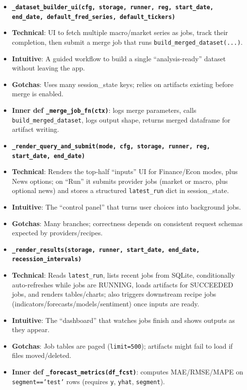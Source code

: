 \documentclass[11pt]{article}
\begin{document}
\begin{itemize}[leftmargin=*,nosep]
\item \textbf{\texttt{\_dataset\_builder\_ui(cfg, storage, runner, reg, start\_date, end\_date, default\_fred\_series, default\_tickers)}}
\item \textbf{Technical}: UI to fetch multiple macro/market series as jobs, track their completion, then submit a merge job that runs \texttt{build\_merged\_dataset(...)}.
\item \textbf{Intuitive}: A guided workflow to build a single “analysis-ready” dataset without leaving the app.
\item \textbf{Gotchas}: Uses many session\_state keys; relies on artifacts existing before merge is enabled.
\item \textbf{Inner def \texttt{\_merge\_job\_fn(ctx)}}: logs merge parameters, calls \texttt{build\_merged\_dataset}, logs output shape, returns merged dataframe for artifact writing.
\end{itemize}



\begin{itemize}[leftmargin=*,nosep]
\item \textbf{\texttt{\_render\_query\_and\_submit(mode, cfg, storage, runner, reg, start\_date, end\_date)}}
\item \textbf{Technical}: Renders the top-half “inputs” UI for Finance/Econ modes, plus News options; on “Run” it submits provider jobs (market or macro, plus optional news) and stores a structured \texttt{latest\_run} dict in session\_state.
\item \textbf{Intuitive}: The “control panel” that turns user choices into background jobs.
\item \textbf{Gotchas}: Many branches; correctness depends on consistent request schemas expected by providers/recipes.
\end{itemize}


\begin{itemize}[leftmargin=*,nosep]
\item \textbf{\texttt{\_render\_results(storage, runner, start\_date, end\_date, recession\_intervals)}}
\item \textbf{Technical}: Reads \texttt{latest\_run}, lists recent jobs from SQLite, conditionally auto-refreshes while jobs are RUNNING, loads artifacts for SUCCEEDED jobs, and renders tables/charts; also triggers downstream recipe jobs (indicators/forecasts/models/sentiment) once inputs are ready.
\item \textbf{Intuitive}: The “dashboard” that watches jobs finish and shows outputs as they appear.
\item \textbf{Gotchas}: Job tables are paged (\texttt{limit=500}); artifacts might fail to load if files moved/deleted.
\item \textbf{Inner def \texttt{\_forecast\_metrics(df\_fcst)}}: computes MAE/RMSE/MAPE on \texttt{segment=='test'} rows (requires \texttt{y}, \texttt{yhat}, \texttt{segment}).
\end{itemize}
\end{document}
